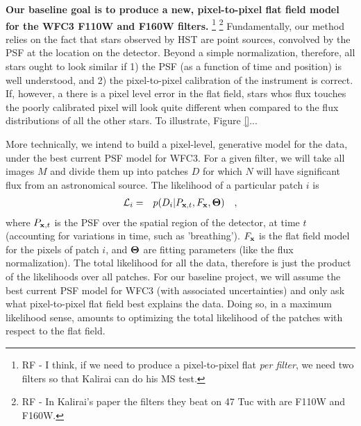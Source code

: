 \documentclass[12pt]{article}
\begin{document}
\textbf{Our baseline goal is to produce a new, pixel-to-pixel
  flat field model for the WFC3 F110W and F160W filters.} \footnote{RF
  - I think, if we need to produce a pixel-to-pixel flat \emph{per
    filter}, we need two filters so that Kalirai can do his MS test.}
\footnote{RF - In Kalirai's paper the filters they beat on 47 Tuc with
  are F110W and F160W.}  Fundamentally, our method relies on the fact
that stars observed by HST are point sources, convolved by the PSF at
the location on the detector.  Beyond a simple normalization,
therefore, all stars ought to look similar if 1) the PSF (as a
function of time and position) is well understood, and 2) the
pixel-to-pixel calibration of the instrument is correct.  If, however,
a there is a pixel level error in the flat field, stars whos flux
touches the poorly calibrated pixel will look quite different when
compared to the flux distributions of all the other stars.  To
illustrate, Figure \ref{}...

More technically, we intend to build a pixel-level, generative model
for the data, under the best current PSF model for WFC3.  For a given
filter, we will take all images $M$ and divide them up into patches $D$
for which $N$ will have significant flux from an astronomical source.
The likelihood of a particular patch $i$ is 
\begin{eqnarray}
\mathcal{L}_i & = & p(D_i|P_{{\bf x},t},F_{{\bf x}},{\bf \Theta})
\quad ,
\end{eqnarray}
where $P_{{\bf x},t}$ is the PSF over the spatial region of the
detector, at time $t$ (accounting for variations in time, such as
'breathing').  $F_{{\bf x}}$ is the flat field model for the pixels of
patch $i$, and ${\bf \Theta}$ are fitting parameters (like the flux
normalization).  The total likelihood
for all the data, therefore is just the product of the likelihoods
over all patches.  For our baseline project, we will assume the best
current PSF model for WFC3 (with associated uncertainties) and only
ask what pixel-to-pixel flat field best explains the data.  Doing so,
in a maximum likelihood sense, amounts to optimizing the total
likelihood of the patches with respect to the flat field.
\end{document}
